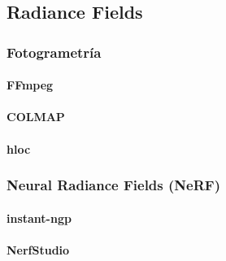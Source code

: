 \documentclass[a4paper, 12pt, spanish, twoside]{article}
\begin{document}
\subsection{Radiance Fields} \label{sec:herramientas:radfi}

\subsubsection{Fotogrametría} \label{sec:herramientas:radfi:fotogram}

\paragraph{FFmpeg} \label{sec:herramientas:radfi:fotogram:ffmpeg}

\paragraph{COLMAP} \label{sec:herramientas:radfi:fotogram:colmap}

\paragraph{hloc} \label{sec:herramientas:radfi:fotogram:hloc}

\subsubsection{Neural Radiance Fields (NeRF)} \label{sec:herramientas:radfi:nerf}

\paragraph{instant-ngp} \label{sec:herramientas:radfi:nerf:instant-ngp}

\paragraph{NerfStudio} \label{sec:herramientas:radfi:nerf:nerfstudio}
\end{document}
